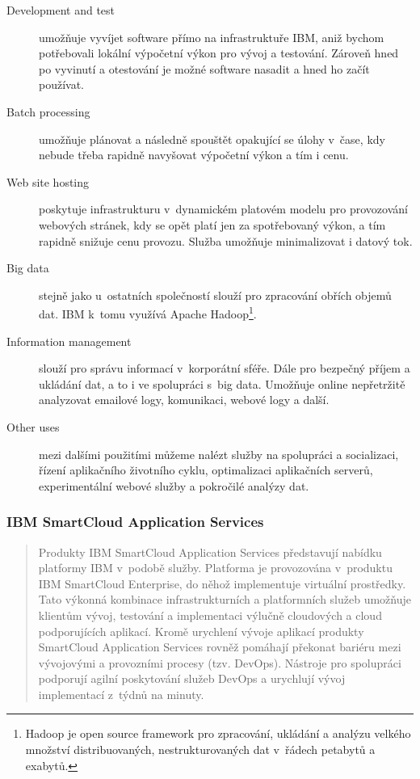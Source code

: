 \begin{description}
	\item[Development and test] umožňuje vyvíjet software přímo na infrastruktuře IBM, aniž bychom potřebovali lokální výpočetní výkon pro vývoj a testování. Zároveň hned po vyvinutí a otestování je možné software nasadit a hned ho začít používat.
	\item[Batch processing] umožňuje plánovat a následně spouštět opakující se úlohy v~čase, kdy nebude třeba rapidně navyšovat výpočetní výkon a tím i cenu.
	\item[Web site hosting] poskytuje infrastrukturu v~dynamickém platovém modelu pro provozování webových stránek, kdy se opět platí jen za spotřebovaný výkon, a tím rapidně snižuje cenu provozu. Služba umožňuje minimalizovat i datový tok.
	\item[Big data] stejně jako u~ostatních společností slouží pro zpracování obřích objemů dat. IBM k~tomu využívá Apache Hadoop\footnote{Hadoop je open source framework pro zpracování, ukládání a analýzu velkého množství distribuovaných, nestrukturovaných dat v~řádech petabytů a exabytů.\cite{ibm:hadoop}}.
	\item[Information management] slouží pro správu informací v~korporátní sféře. Dále pro bezpečný příjem a ukládání dat, a to i ve spolupráci s~big data. Umožňuje online nepřetržitě analyzovat emailové logy, komunikaci, webové logy a další.
	\item[Other uses] mezi dalšími použitími můžeme nalézt služby na spolupráci a socializaci, řízení aplikačního životního cyklu, optimalizaci aplikačních serverů, experimentální webové služby a pokročilé analýzy dat.
\end{description}

\subsubsection{IBM SmartCloud Application Services}
\begin{quote}
Produkty IBM SmartCloud Application Services představují nabídku platformy IBM v~podobě služby. Platforma je provozována v~produktu IBM SmartCloud Enterprise, do něhož implementuje virtuální prostředky. Tato výkonná kombinace infrastrukturních a platformních služeb umožňuje klientům vývoj, testování a implementaci výlučně cloudových a cloud podporujících aplikací. Kromě urychlení vývoje aplikací produkty SmartCloud Application Services rovněž pomáhají překonat bariéru mezi vývojovými a provozními procesy (tzv. DevOps). Nástroje pro spolupráci podporují agilní poskytování služeb DevOps a urychlují vývoj implementací z~týdnů na minuty.\cite{ibm:smartCloudEnt}
\end{quote}

